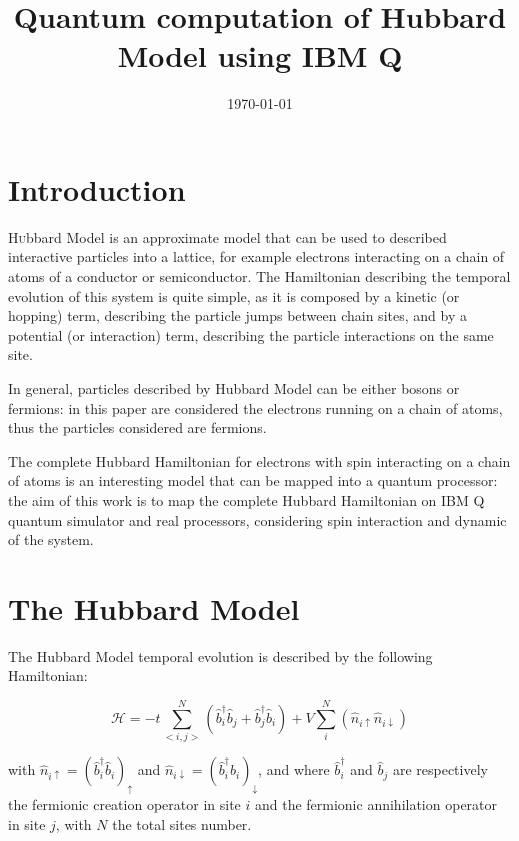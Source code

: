 \documentclass[twoside,twocolumn]{article}
\title{Quantum computation of Hubbard Model using IBM Q} %
\author{

}
\date{\today} %
\begin{document}
\maketitle


\section{Introduction}

\lettrine[nindent=0em,lines=3]{H}ubbard Model is an approximate model that can be used to described
interactive particles into a lattice, for example electrons interacting on a chain of atoms of a conductor or semiconductor.
The Hamiltonian describing the temporal evolution of this system is quite simple, as it is composed by a
kinetic (or hopping) term, describing the particle jumps between chain sites,
and by a potential (or interaction) term, describing the particle interactions on the same site.

In general, particles described by Hubbard Model can be either bosons or fermions: in this paper are considered the electrons
running on a chain of atoms, thus the particles considered are fermions.

The complete Hubbard Hamiltonian for electrons with spin interacting on a chain of atoms is an interesting model
that can be mapped into a quantum processor: the aim of this work is to map the complete Hubbard Hamiltonian on
IBM Q quantum simulator and real processors, considering spin interaction and dynamic of the system.


\section{The Hubbard Model}

The Hubbard Model temporal evolution is described by the following Hamiltonian:

\begin{equation}
\mathcal{H} = -t \sum_{<i,j>}^N{(\hat{b}^{\dagger}_i \hat{b}_j+\hat{b}^{\dagger}_j \hat{b}_i)}
+ V \sum_{i}^N{(\hat{n}_{i\uparrow}\hat{n}_{i\downarrow})}
\end{equation}

with $\hat{n}_{i\uparrow} = (\hat{b}^{\dagger}_i\hat{b}_i)_\uparrow$ and
$\hat{n}_{i\downarrow} = (\hat{b}^{\dagger}_i\hat{b}_i)_\downarrow$, and where $\hat{b}^{\dagger}_i$ and
$\hat{b}_j$ are respectively the fermionic creation operator in site $i$ and the fermionic annihilation
operator in site $j$, with $N$ the total sites number.
\end{document}
